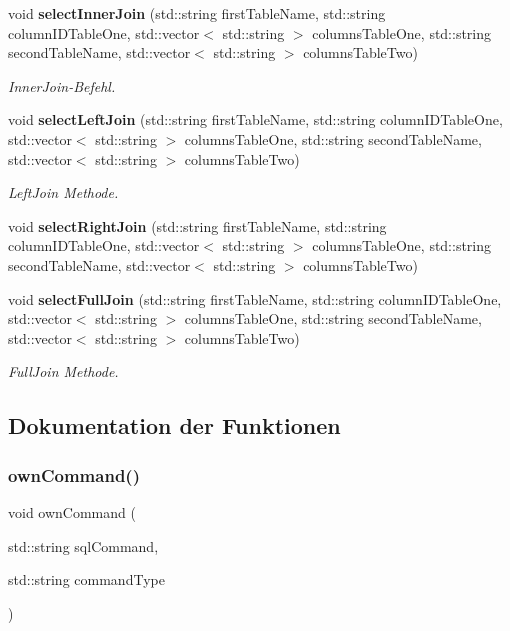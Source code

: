 \begin{DoxyCompactItemize}
void \textbf{ select\+Inner\+Join} (std\+::string first\+Table\+Name, std\+::string column\+I\+D\+Table\+One, std\+::vector$<$ std\+::string $>$ columns\+Table\+One, std\+::string second\+Table\+Name, std\+::vector$<$ std\+::string $>$ columns\+Table\+Two)
\begin{DoxyCompactList}\small\item\em Inner\+Join-\/\+Befehl. \end{DoxyCompactList}\item 
void \textbf{ select\+Left\+Join} (std\+::string first\+Table\+Name, std\+::string column\+I\+D\+Table\+One, std\+::vector$<$ std\+::string $>$ columns\+Table\+One, std\+::string second\+Table\+Name, std\+::vector$<$ std\+::string $>$ columns\+Table\+Two)
\begin{DoxyCompactList}\small\item\em Left\+Join Methode. \end{DoxyCompactList}\item 
void \textbf{ select\+Right\+Join} (std\+::string first\+Table\+Name, std\+::string column\+I\+D\+Table\+One, std\+::vector$<$ std\+::string $>$ columns\+Table\+One, std\+::string second\+Table\+Name, std\+::vector$<$ std\+::string $>$ columns\+Table\+Two)
\item 
void \textbf{ select\+Full\+Join} (std\+::string first\+Table\+Name, std\+::string column\+I\+D\+Table\+One, std\+::vector$<$ std\+::string $>$ columns\+Table\+One, std\+::string second\+Table\+Name, std\+::vector$<$ std\+::string $>$ columns\+Table\+Two)
\begin{DoxyCompactList}\small\item\em Full\+Join Methode. \end{DoxyCompactList}\end{DoxyCompactItemize}


\subsection{Dokumentation der Funktionen}
\mbox{\label{selection_request_8hpp_a1909c1b8666cf6e3d31a014c9a9ad2d7}} 
\subsubsection{own\+Command()}
{\footnotesize\ttfamily void own\+Command (\begin{DoxyParamCaption}\item[{std\+::string}]{sql\+Command,  }\item[{std\+::string}]{command\+Type }\end{DoxyParamCaption})}



